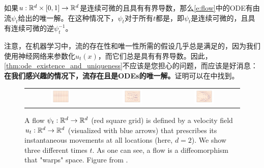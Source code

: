 如果$u:\mathbb{R}^d\times[0,1]\to\mathbb{R}^d$是连续可微的且具有有界导数，那么\eqref{e:flow}中的ODE有由流$\psi_t$给出的唯一解。在这种情况下，$\psi_t$对于所有$t$都是，即$\psi_t$是连续可微的，且具有连续可微的逆$\psi_t^{-1}$。

注意，在机器学习中，流的存在性和唯一性所需的假设几乎总是满足的，因为我们使用神经网络来参数化$u_t(x)$，而它们总是具有有界导数。因此，\cref{thm:ode_existence_and_uniqueness}不应该是您担心的问题，而应该是好消息：\textbf{在我们感兴趣的情况下，流存在且是ODEs的唯一解。}证明可以在\citep{perko2013differential,coddington1956theory}中找到。

\begin{figure}
    \centering
    \begin{tabular}{ccc}
         \includegraphics[width=0.3\textwidth]{fm_guide_assets/flow_1.png} &
         \includegraphics[width=0.3\textwidth]{fm_guide_assets/flow_10.png} &
         \includegraphics[width=0.3\textwidth]{fm_guide_assets/flow_16.png} 
    \end{tabular}
    \caption{A flow $\psi_t:\mathbb R^d\rightarrow \mathbb R^d$ (red square grid) is defined by a velocity field $u_t :\mathbb R^d\rightarrow\mathbb R^d$ (visualized with blue arrows) that prescribes its instantaneous movements at all locations (here, $d=2$). We show three different times $t$. As one can see, a flow is a diffeomorphism that "warps" space. Figure from \citep{lipman2024flow}.}
    \label{fig:flow}
\end{figure}

